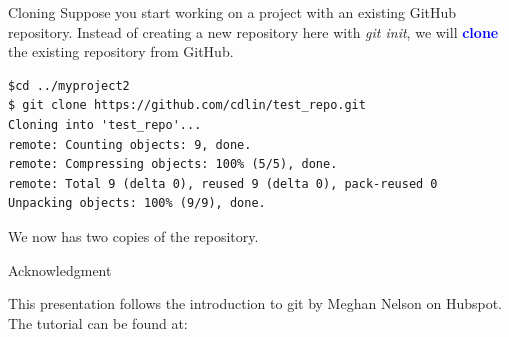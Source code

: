 \documentclass[11pt]{beamer}
\begin{document}
\begin{frame}[fragile]{Cloning}
Suppose you start working on a project with an existing GitHub repository. Instead of creating a new repository here with \emph{git init}, we will \textcolor{blue}{\textbf{clone}} the existing repository from GitHub.
\begin{lstlisting}
$cd ../myproject2
$ git clone https://github.com/cdlin/test_repo.git
Cloning into 'test_repo'...
remote: Counting objects: 9, done.
remote: Compressing objects: 100% (5/5), done.
remote: Total 9 (delta 0), reused 9 (delta 0), pack-reused 0
Unpacking objects: 100% (9/9), done.
\end{lstlisting}
We now has two copies of the repository.
\end{frame}

\begin{frame}[fragile]{Acknowledgment}

This presentation follows the introduction to git by Meghan Nelson on Hubspot. The tutorial can be found at: \href{https://product.hubspot.com/blog/git-and-github-tutorial-for-beginners}{\color{blue}{https://product.hubspot.com/blog/git-and-github-tutorial-for-beginners}}
\end{frame}

\end{document}
